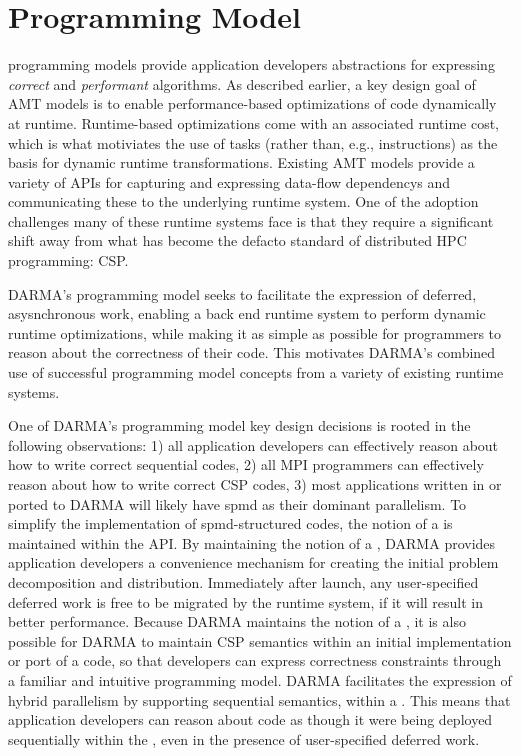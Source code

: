 

\section{Programming Model}
\label{sec:programmingmodel}


\Glspl{programming model} provide application developers 
abstractions for expressing \emph{correct} and \emph{performant} algorithms. 
As described earlier, a key design goal of \gls{AMT} models is to enable performance-based
optimizations of code dynamically at runtime.
Runtime-based optimizations come with an associated runtime cost, which is what
motiviates the use of \glspl{task} (rather than, e.g., instructions) as the basis for dynamic runtime transformations.
Existing \gls{AMT} models provide a variety of \glspl{API} for capturing and expressing
\glspl{data-flow dependency} and communicating these to the underlying
\gls{runtime system}.  
One of the adoption challenges many of these \glspl{runtime system} face is
that they require a significant shift away from what has become
the defacto standard of distributed HPC programming: \gls{CSP}. 

\gls{DARMA}'s \gls{programming model} seeks to facilitate the expression of
deferred, asysnchronous work, enabling a \gls{back end} \gls{runtime system}
to perform dynamic runtime optimizations, while making it as simple as possible
for programmers to reason about the correctness of their code.
This motivates \gls{DARMA}'s combined use of successful \gls{programming model}
concepts from a variety of existing \glspl{runtime system}. 

One of \gls{DARMA}'s \gls{programming model} key design decisions is rooted in
the following observations: 
1) all application
developers can effectively reason about how to write correct sequential codes,
2) all MPI
programmers can effectively reason about how to write correct \gls{CSP} codes,
3) most applications written in or ported to \gls{DARMA} will likely
have \gls{spmd} as their dominant parallelism.
To simplify the implementation of \gls{spmd}-structured codes, the notion of a
 is maintained within the \gls{API}.   
By maintaining the notion of a , \gls{DARMA} provides application developers a convenience mechanism for creating
the initial problem decomposition and distribution.
Immediately after launch, any user-specified \gls{deferred work} is free to be
migrated by the \gls{runtime system}, if it will result in
better performance.
Because \gls{DARMA} maintains the notion of a , it is also
possible for \gls{DARMA} to maintain \gls{CSP} semantics within an initial
implementation or port of a code, 
so that developers can express correctness constraints through a familiar and
intuitive \gls{programming model}.  
\gls{DARMA} facilitates the expression of hybrid parallelism by supporting  
\gls{sequential semantics}, within a .  This means that application
developers can reason about code as
though it were being deployed sequentially within the , even in
the presence of user-specified \gls{deferred work}.   

